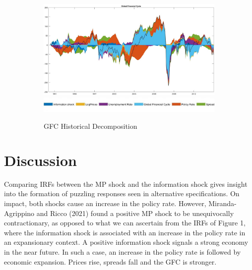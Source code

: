 \documentclass[11pt,a4paper]{article}
\begin{document}
\begin{figure}[hp]
        \vspace{0.2cm} %
        
        \begin{subfigure}{\textwidth}
            \centering
            \includegraphics[scale=.32]{Graphs/GFC_HD_3lags.jpg}
            \includegraphics*[scale=0.21]{Graphs/Inkedlegend.jpg}
            \captionsetup{font=scriptsize}
            \caption{GFC Historical Decomposition}
            \label{fig:GFChd}
        \end{subfigure}

        \caption{ }
        \label{fig:additional_elements}
    \end{figure}




\section{Discussion}


Comparing IRFs between the MP shock and the information shock gives insight into the formation of puzzling responses seen in alternative specifications. 
On impact, both shocks cause an increase in the policy rate. However, Miranda-Agrippino and Ricco (2021) found a positive MP shock to be unequivocally contractionary, as opposed to what we can ascertain from the IRFs of Figure 1, where the information shock is associated with an increase in the policy rate in an expansionary context. 
A positive information shock signals a strong economy in the near future. In such a case, an increase in the policy rate is followed by economic expansion. Prices rise, spreads fall and the GFC is stronger. 
    
\end{document}
